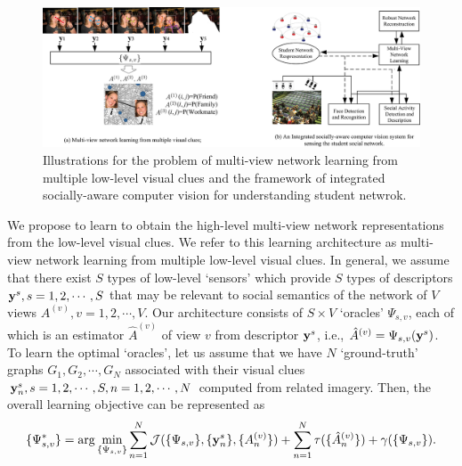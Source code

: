 \begin{figure}[t!]
\begin{center}
\includegraphics[width=\columnwidth]{featurelearn}
\end{center}
\vspace{-0.25in} \caption{\captionsize 
Illustrations for the problem of multi-view network learning from multiple low-level visual clues and the framework of integrated socially-aware computer vision for understanding student netwrok. \label{fig:featurelearn}\afterfigspace}
\end{figure}


We propose to learn to obtain the high-level multi-view network representations from the low-level visual clues. We refer to this learning architecture as multi-view network learning from multiple low-level visual clues. In general, we assume that there exist $S$ types of low-level `sensors' which provide $S$ types of descriptors ${\bf y}^s, s=1,2,\cdots,S$ that may be relevant to social semantics of the network of $V$ views $A^{(v)}, v=1,2,\cdots,V$. Our architecture consists of $S\times V$ `oracles' $\Psi_{s,v}$, each of which is an estimator $\hat{A}^{(v)}$ of view $v$ from descriptor ${\bf y}^s$, i.e., $\hat{A}^{(v)}=\Psi_{s,v}({\bf y}^s)$. To learn the optimal `oracles', let us assume that we have $N$ `ground-truth' graphs $G_1, G_2, \cdots, G_N$ associated with their visual clues ${\bf y}^{s}_{n}, s=1,2,\cdots,S, n=1,2,\cdots,N$ computed from related imagery.  Then, the overall learning objective can be represented as 
\begin{equation}\label{eq:sensing}
\{\Psi^{*}_{s,v}\}=\arg\min_{\{\Psi_{s,v}\}}\sum_{n=1}^{N}\mathcal{J}(\{\Psi_{s,v}\}, \{{\bf y}^{s}_n\}, \{A^{(v)}_n\})+\sum_{n=1}^{N}\tau(\{\hat{A}^{(v)}_n\})+\gamma(\{\Psi_{s,v}\}).
 \end{equation}
 
